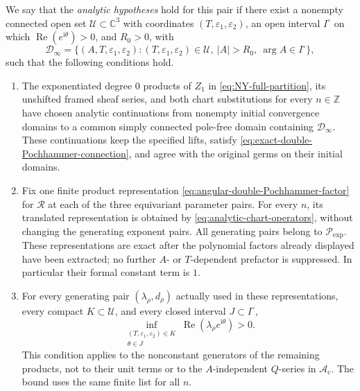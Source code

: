 \documentclass{amsart}
\theoremstyle{definition}
\numberwithin{equation}{section}
\newcommand{\C}{\mathbb C}
\newcommand{\Z}{\mathbb Z}
\newcommand{\eps}{\varepsilon}
\begin{document}
We say that the \emph{analytic hypotheses} hold for this pair if there exist a nonempty connected open set \(\mathscr U\subset\C^3\) with coordinates \((T,\eps_1,\eps_2)\), an open interval \(I^\circ\) on which \(\operatorname{Re}(e^{\mathrm i\theta})>0\), and \(R_0>0\), with
\[
 \mathscr D_\infty=
 \{(A,T,\eps_1,\eps_2):(T,\eps_1,\eps_2)\in\mathscr U,\
 |A|>R_0,\ \arg A\in I^\circ\},
\]
such that the following conditions hold.
\begin{enumerate}
\item[(A1)] The exponentiated degree \(0\) products of \(Z_1\) in \eqref{eq:NY-full-partition}, its unshifted framed sheaf series, and both chart substitutions for every \(n\in\Z\) have chosen analytic continuations from nonempty initial convergence domains to a common simply connected pole-free domain containing \(\mathscr D_\infty\).  These continuations keep the specified lifts, satisfy \eqref{eq:exact-double-Pochhammer-connection}, and agree with the original germs on their initial domains.

\item[(A2)] Fix one finite product representation \eqref{eq:angular-double-Pochhammer-factor} for \(\mathcal R\) at each of the three equivariant parameter pairs.  For every \(n\), its translated representation is obtained by \eqref{eq:analytic-chart-operators}, without changing the generating exponent pairs.  All generating pairs belong to \(\mathcal P_{\mathrm{exp}}\).  These representations are exact after the polynomial factors already displayed have been extracted; no further \(A\)- or \(T\)-dependent prefactor is suppressed.  In particular their formal constant term is \(1\).

\item[(A3)] For every generating pair \((\lambda_\rho,d_\rho)\) actually used in these representations, every compact \(K\subset\mathscr U\), and every closed interval \(J\subset I^\circ\),
\begin{equation}
 \inf_{\substack{(T,\eps_1,\eps_2)\in K\\ \theta\in J}}
 \operatorname{Re}(\lambda_\rho e^{\mathrm i\theta})>0.
\label{eq:P2-asymptotic-decay-condition}
\end{equation}
This condition applies to the nonconstant generators of the remaining products, not to their unit terms or to the \(A\)-independent \(Q\)-series in \(\mathscr A_{\mathrm c}\).  The bound uses the same finite list for all \(n\).


\end{enumerate}
\end{document}
